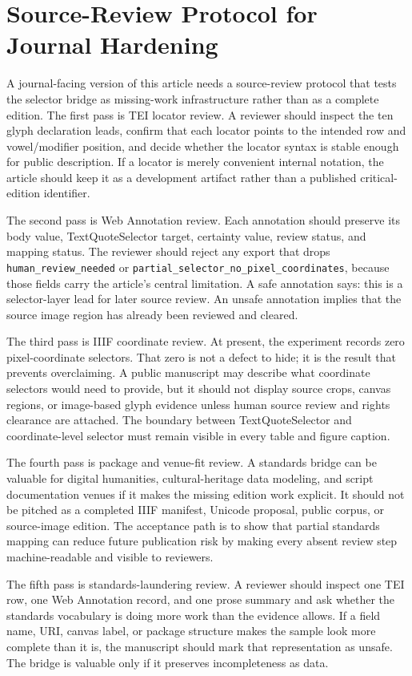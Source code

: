 \documentclass[sigconf,nonacm]{acmart}
\begin{document}
\section{Source-Review Protocol for Journal Hardening}
A journal-facing version of this article needs a source-review protocol that
tests the selector bridge as missing-work infrastructure rather than as a
complete edition. The first pass is TEI locator review. A reviewer should inspect
the ten glyph declaration leads, confirm that each locator points to the intended
row and vowel/modifier position, and decide whether the locator syntax is stable
enough for public description. If a locator is merely convenient internal
notation, the article should keep it as a development artifact rather than a
published critical-edition identifier.

The second pass is Web Annotation review. Each annotation should preserve its
body value, TextQuoteSelector target, certainty value, review status, and
mapping status. The reviewer should reject any export that drops
\texttt{human\_review\_needed} or \texttt{partial\_selector\_no\_pixel\_coordinates}, because those
fields carry the article's central limitation. A safe annotation says: this is a
selector-layer lead for later source review. An unsafe annotation implies that
the source image region has already been reviewed and cleared.

The third pass is IIIF coordinate review. At present, the experiment records zero
pixel-coordinate selectors. That zero is not a defect to hide; it is the result
that prevents overclaiming. A public manuscript may describe what coordinate
selectors would need to provide, but it should not display source crops, canvas
regions, or image-based glyph evidence unless human source review and rights
clearance are attached. The boundary between TextQuoteSelector and
coordinate-level selector must remain visible in every table and figure caption.

The fourth pass is package and venue-fit review. A standards bridge can be
valuable for digital humanities, cultural-heritage data modeling, and script
documentation venues if it makes the missing edition work explicit. It should
not be pitched as a completed IIIF manifest, Unicode proposal, public corpus, or
source-image edition. The acceptance path is to show that partial standards
mapping can reduce future publication risk by making every absent review step
machine-readable and visible to reviewers.

The fifth pass is standards-laundering review. A reviewer should inspect one TEI
row, one Web Annotation record, and one prose summary and ask whether the
standards vocabulary is doing more work than the evidence allows. If a field
name, URI, canvas label, or package structure makes the sample look more complete
than it is, the manuscript should mark that representation as unsafe. The bridge
is valuable only if it preserves incompleteness as data.
\end{document}
